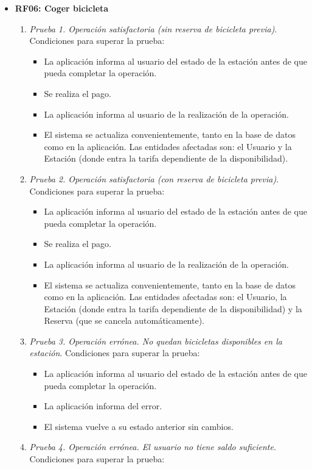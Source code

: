 \begin{itemize}
	\item \textbf{RF06: Coger bicicleta}
	\begin{enumerate}
		\item \textit{Prueba 1. Operación satisfactoria (sin reserva de bicicleta previa)}. Condiciones para superar la prueba:
		\begin{itemize}
			\item La aplicación informa al usuario del estado de la estación antes de que pueda completar la operación.
			\item Se realiza el pago.
			\item La aplicación informa al usuario de la realización de la operación.
			\item El sistema se actualiza convenientemente, tanto en la base de datos como en la aplicación. Las entidades afectadas son: el Usuario y la Estación (donde entra la tarifa dependiente de la disponibilidad).
		\end{itemize}
		\item \textit{Prueba 2. Operación satisfactoria (con reserva de bicicleta previa)}. Condiciones para superar la prueba:
		\begin{itemize}
			\item La aplicación informa al usuario del estado de la estación antes de que pueda completar la operación.
			\item Se realiza el pago.
			\item La aplicación informa al usuario de la realización de la operación.
			\item El sistema se actualiza convenientemente, tanto en la base de datos como en la aplicación. Las entidades afectadas son: el Usuario, la Estación (donde entra la tarifa dependiente de la disponibilidad) y la Reserva (que se cancela automáticamente).
		\end{itemize}
		\item \textit{Prueba 3. Operación errónea. No quedan bicicletas disponibles en la estación}. Condiciones para superar la prueba:
		\begin{itemize}
			\item La aplicación informa al usuario del estado de la estación antes de que pueda completar la operación.
			\item La aplicación informa del error.
			\item El sistema vuelve a su estado anterior sin cambios.
		\end{itemize}
		\item \textit{Prueba 4. Operación errónea. El usuario no tiene saldo suficiente}. Condiciones para superar la prueba:

\end{enumerate}
\end{itemize}
